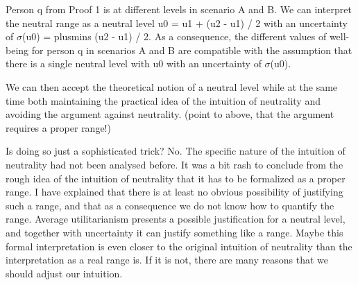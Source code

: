 Person q from Proof 1 is at different levels in scenario A and B. We can interpret the neutral range as a neutral level u0 = u1 + (u2 - u1) / 2 with an uncertainty of $\sigma $(u0) = plusmins (u2 - u1) / 2. As a consequence, the different values of well-being for person q in scenarios A and B are compatible with the assumption that there is a single neutral level with u0 with an uncertainty of $\sigma $(u0).  

We can then accept the theoretical notion of a neutral level while at the same time both maintaining the practical idea of the intuition of neutrality and avoiding the argument against neutrality. (point to above, that the argument requires a proper range!) 

Is doing so just a sophisticated trick? No. The specific nature of the intuition of neutrality had not been analysed before. It was a bit rash to conclude from the rough idea of the intuition of neutrality that it has to be formalized as a proper range. I have explained that there is at least no obvious possibility of justifying such a range, and that as a consequence we do not know how to quantify the range. Average utilitarianism presents a possible justification for a neutral level, and together with uncertainty it can justify something like a range. Maybe this formal interpretation is even closer to the original intuition of neutrality than the interpretation as a real range is. If it is not, there are many reasons that we should adjust our intuition.  
